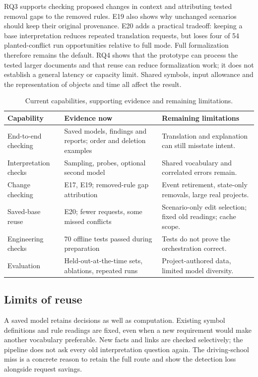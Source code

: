 RQ3 supports checking proposed changes in context and attributing tested removal gaps to the removed rules. E19 also shows why unchanged scenarios should keep their original provenance. E20 adds a practical tradeoff: keeping a base interpretation reduces repeated translation requests, but loses four of 54 planted-conflict run opportunities relative to full mode. Full formalization therefore remains the default. RQ4 shows that the prototype can process the tested larger documents and that reuse can reduce formalization work; it does not establish a general latency or capacity limit. Shared symbols, input allowance and the representation of objects and time all affect the result.
\begin{table}[H]
\centering
\begin{tabularx}{\linewidth}{@{}lXX@{}}
\toprule
Capability & Evidence now & Remaining limitations \\
\midrule
End-to-end checking & Saved models, findings and reports; order and deletion examples & Translation and explanation can still misstate intent. \\
Interpretation checks & Sampling, probes, optional second model & Shared vocabulary and correlated errors remain. \\
Change checking & E17, E19; removed-rule gap attribution & Event retirement, state-only removals, large real projects. \\
Saved-base reuse & E20; fewer requests, some missed conflicts & Scenario-only edit selection; fixed old readings; cache scope. \\
Engineering checks & 70 offline tests passed during preparation & Tests do not prove the orchestration correct. \\
Evaluation & Held-out-at-the-time sets, ablations, repeated runs & Project-authored data, limited model diversity. \\
\bottomrule
\end{tabularx}
\caption{Current capabilities, supporting evidence and remaining limitations.}
\end{table}

\subsection{Limits of reuse}

A saved model retains decisions as well as computation. Existing symbol definitions and rule readings are fixed, even when a new requirement would make another vocabulary preferable. New facts and links are checked selectively; the pipeline does not ask every old interpretation question again. The driving-school miss is a concrete reason to retain the full route and show the detection loss alongside request savings.

